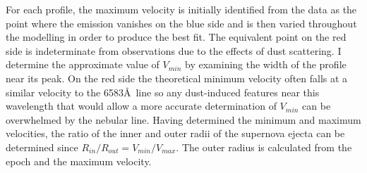 For each profile, the maximum velocity is initially identified from the 
data as the point where the emission vanishes on the blue side and is then 
varied throughout the modelling in order to produce the best fit.  The 
equivalent point on the red side is indeterminate from observations due to 
the effects of dust scattering.  I determine the approximate value of 
$V_{min}$ by examining the width of the profile near its peak. On the red side the theoretical minimum velocity often 
falls at a similar velocity to the 6583\AA\ line so any dust-induced 
features near this wavelength that would allow a more accurate 
determination of $V_{min}$ can be overwhelmed by the nebular line.  
Having determined the minimum and maximum velocities, the ratio of the 
inner and outer radii of the supernova ejecta can be determined since 
$R_{in}/R_{out}=V_{min}/V_{max}$.  The outer radius is calculated from the 
epoch and the maximum velocity.

